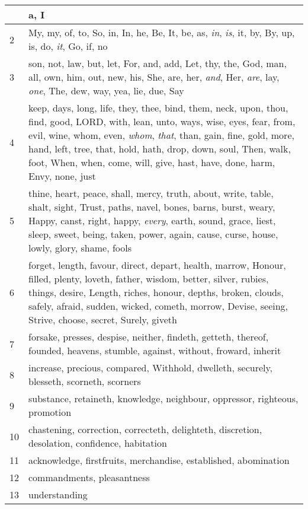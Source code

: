 \begin{center}
\begin{longtable}{l|p{3.75in}}
\hline \hline 
\endlastfoot 
1 & a, I\\ \hline 
2 & My, my, of, to, So, in, In, he, Be, It, be, as, \emph{in}, \emph{is}, it, by, By, up, is, do, \emph{it}, Go, if, no\\ \hline 
3 & son, not, law, but, let, For, and, add, Let, thy, the, God, man, all, own, him, out, new, his, She, are, her, \emph{and}, Her, \emph{are}, lay, \emph{one}, The, dew, way, yea, lie, due, Say\\ \hline 
4 & keep, days, long, life, they, thee, bind, them, neck, upon, thou, find, good, LORD, with, lean, unto, ways, wise, eyes, fear, from, evil, wine, whom, even, \emph{whom}, \emph{that}, than, gain, fine, gold, more, hand, left, tree, that, hold, hath, drop, down, soul, Then, walk, foot, When, when, come, will, give, hast, have, done, harm, Envy, none, just\\ \hline 
5 & thine, heart, peace, shall, mercy, truth, about, write, table, shalt, sight, Trust, paths, navel, bones, barns, burst, weary, Happy, canst, right, happy, \emph{every}, earth, sound, grace, liest, sleep, sweet, being, taken, power, again, cause, curse, house, lowly, glory, shame, fools\\ \hline 
6 & forget, length, favour, direct, depart, health, marrow, Honour, filled, plenty, loveth, father, wisdom, better, silver, rubies, things, desire, Length, riches, honour, depths, broken, clouds, safely, afraid, sudden, wicked, cometh, morrow, Devise, seeing, Strive, choose, secret, Surely, giveth\\ \hline 
7 & forsake, presses, despise, neither, findeth, getteth, thereof, founded, heavens, stumble, against, without, froward, inherit\\ \hline 
8 & increase, precious, compared, Withhold, dwelleth, securely, blesseth, scorneth, scorners\\ \hline 
9 & substance, retaineth, knowledge, neighbour, oppressor, righteous, promotion\\ \hline 
10 & chastening, correction, correcteth, delighteth, discretion, desolation, confidence, habitation\\ \hline 
11 & acknowledge, firstfruits, merchandise, established, abomination\\ \hline 
12 & commandments, pleasantness\\ \hline 
13 & understanding\\ \hline 
\end{longtable} 
\end{center} 




 
